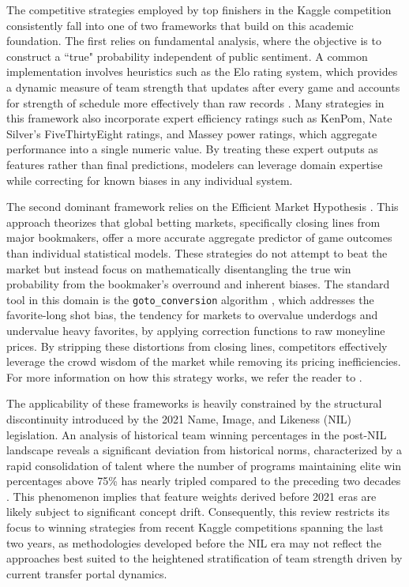 \documentclass[12pt,leqno]{article}\usepackage[pdftex]{graphicx}\usepackage[dvipsnames]{xcolor}
\theoremstyle{remark}
\begin{document}
The competitive strategies employed by top finishers in the Kaggle competition consistently fall into one of two frameworks that build on this academic foundation. The first relies on fundamental analysis, where the objective is to construct a ``true" probability independent of public sentiment. A common implementation involves heuristics such as the Elo rating system, which provides a dynamic measure of team strength that updates after every game and accounts for strength of schedule more effectively than raw records \cite{chess}. Many strategies in this framework also incorporate expert efficiency ratings such as KenPom, Nate Silver's FiveThirtyEight ratings, and Massey power ratings, which aggregate performance into a single numeric value. By treating these expert outputs as features rather than final predictions, modelers can leverage domain expertise while correcting for known biases in any individual system.

The second dominant framework relies on the Efficient Market Hypothesis \cite{EMH}. This approach theorizes that global betting markets, specifically closing lines from major bookmakers, offer a more accurate aggregate predictor of game outcomes than individual statistical models. These strategies do not attempt to beat the market but instead focus on mathematically disentangling the true win probability from the bookmaker's overround and inherent biases. The standard tool in this domain is the \texttt{goto\_conversion} algorithm \cite{goto}, which addresses the favorite-long shot bias, the tendency for markets to overvalue underdogs and undervalue heavy favorites, by applying correction functions to raw moneyline prices. By stripping these distortions from closing lines, competitors effectively leverage the crowd wisdom of the market while removing its pricing inefficiencies. For more information on how this strategy works, we refer the reader to \cite{goto}.

The applicability of these frameworks is heavily constrained by the structural discontinuity introduced by the 2021 Name, Image, and Likeness (NIL) legislation. An analysis of historical team winning percentages in the post-NIL landscape reveals a significant deviation from historical norms, characterized by a rapid consolidation of talent where the number of programs maintaining elite win percentages above 75\% has nearly tripled compared to the preceding two decades \cite{CBS}. This phenomenon implies that feature weights derived before 2021 eras are likely subject to significant concept drift. Consequently, this review restricts its focus to winning strategies from recent Kaggle competitions spanning the last two years, as methodologies developed before the NIL era may not reflect the approaches best suited to the heightened stratification of team strength driven by current transfer portal dynamics.
\end{document}
